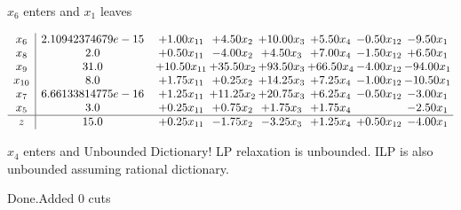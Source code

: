 \documentclass[8pt]{article}
\begin{document}
 $ x_{6} $ enters and $ x_{1} $ leaves 

 \[\begin{array}{c| c c@{\hskip 2pt} c@{\hskip 2pt} c@{\hskip 2pt} c@{\hskip 2pt} c@{\hskip 2pt} c@{\hskip 2pt} }
 x_{6}   &  2.10942374679e-15 & +  1.00 x_{11} & +  4.50 x_{2} & + 10.00 x_{3} & +  5.50 x_{4} & -0.50 x_{12} & -9.50 x_{1}\\
 x_{8}   &  2.0 & +  0.50 x_{11} & -4.00 x_{2} & +  4.50 x_{3} & +  7.00 x_{4} & -1.50 x_{12} & +  6.50 x_{1}\\
 x_{9}   &  31.0 & + 10.50 x_{11} & + 35.50 x_{2} & + 93.50 x_{3} & + 66.50 x_{4} & -4.00 x_{12} & -94.00 x_{1}\\
 x_{10}   &  8.0 & +  1.75 x_{11} & +  0.25 x_{2} & + 14.25 x_{3} & +  7.25 x_{4} & -1.00 x_{12} & -10.50 x_{1}\\
 x_{7}   &  6.66133814775e-16 & +  1.25 x_{11} & + 11.25 x_{2} & + 20.75 x_{3} & +  6.25 x_{4} & -0.50 x_{12} & -3.00 x_{1}\\
 x_{5}   &  3.0 & +  0.25 x_{11} & +  0.75 x_{2} & +  1.75 x_{3} & +  1.75 x_{4} &   & -2.50 x_{1}\\
\hline
z    &  15.0 & +  0.25 x_{11} & -1.75 x_{2} & -3.25 x_{3} & +  1.25 x_{4} & +  0.50 x_{12} & -4.00 x_{1}\\
\end{array}\]


 $ x_{4} $ enters and Unbounded Dictionary!
 LP relaxation is unbounded. ILP is also unbounded assuming rational dictionary. 

Done.Added 0 cuts 
\end{document}
